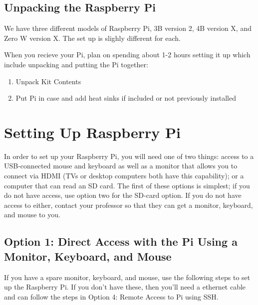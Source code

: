 \documentclass{article}\usepackage[]{graphicx}\usepackage[]{color}
\begin{document}
\subsection{Unpacking the Raspberry Pi}

We have three different models of Raspberry Pi, 3B version 2, 4B version X, and Zero W version X. The set up is slighly different for each. 

When you recieve your Pi, plan on spending about 1-2 hours setting it up which include unpacking and putting the Pi together: 

\begin{enumerate}

\item Unpack Kit Contents

\item Put Pi in case and add heat sinks if included or not previously installed

\end{enumerate}

\section{Setting Up Raspberry Pi}

In order to set up your Raspberry Pi, you will need one of two things: access to a USB-connected mouse and keyboard as well as a monitor that allows you to connect via HDMI (TVs or desktop computers both have this capability); or a computer that can read an SD card.  The first of these options is simplest; if you do not have access, use option two for the SD-card option.  If you do not have access to either, contact your professor so that they can get a monitor, keyboard, and mouse to you.

\subsection{Option 1: Direct Access with the Pi Using a Monitor, Keyboard, and Mouse}

If you have a spare monitor, keyboard, and mouse, use the following steps to set up the Raspberry Pi. If you don't have these, then you'll need a ethernet cable and can follow the steps in Option 4: Remote Access to Pi using SSH. 
\end{document}
